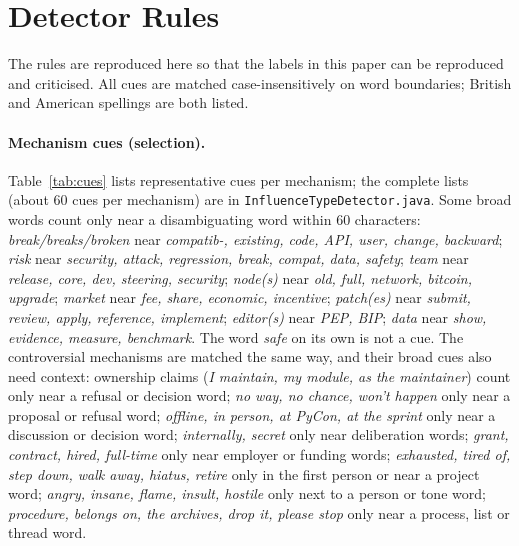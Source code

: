 \appendix

\section{Detector Rules}
\label{app:rules}

The rules are reproduced here so that the labels in this paper can be reproduced and criticised. All cues are matched case-insensitively on word boundaries; British and American spellings are both listed.

\paragraph{Mechanism cues (selection).} Table~\ref{tab:cues} lists representative cues per mechanism; the complete lists (about 60 cues per mechanism) are in \texttt{InfluenceTypeDetector.java}. Some broad words count only near a disambiguating word within 60 characters: \emph{break/breaks/broken} near \emph{compatib-, existing, code, API, user, change, backward}; \emph{risk} near \emph{security, attack, regression, break, compat, data, safety}; \emph{team} near \emph{release, core, dev, steering, security}; \emph{node(s)} near \emph{old, full, network, bitcoin, upgrade}; \emph{market} near \emph{fee, share, economic, incentive}; \emph{patch(es)} near \emph{submit, review, apply, reference, implement}; \emph{editor(s)} near \emph{PEP, BIP}; \emph{data} near \emph{show, evidence, measure, benchmark}. The word \emph{safe} on its own is not a cue. The controversial mechanisms are matched the same way, and their broad cues also need context: ownership claims (\emph{I maintain, my module, as the maintainer}) count only near a refusal or decision word; \emph{no way, no chance, won't happen} only near a proposal or refusal word; \emph{offline, in person, at PyCon, at the sprint} only near a discussion or decision word; \emph{internally, secret} only near deliberation words; \emph{grant, contract, hired, full-time} only near employer or funding words; \emph{exhausted, tired of, step down, walk away, hiatus, retire} only in the first person or near a project word; \emph{angry, insane, flame, insult, hostile} only next to a person or tone word; \emph{procedure, belongs on, the archives, drop it, please stop} only near a process, list or thread word.

